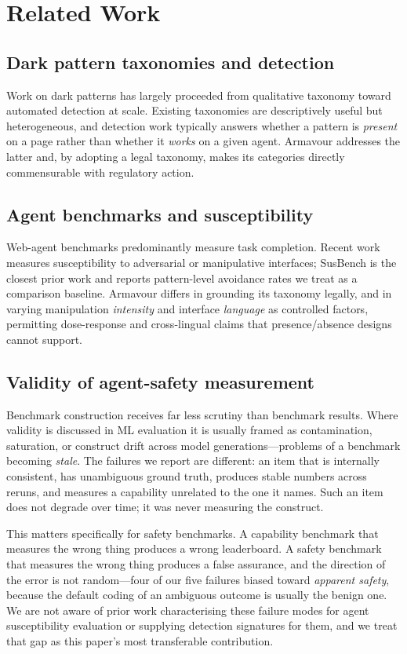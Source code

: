 \documentclass[conference]{IEEEtran}
\begin{document}
\section{Related Work}

\subsection{Dark pattern taxonomies and detection}

Work on dark patterns has largely proceeded from qualitative taxonomy
toward automated detection at scale. Existing taxonomies are
descriptively useful but heterogeneous, and detection work typically
answers whether a pattern is \emph{present} on a page rather than
whether it \emph{works} on a given agent. Armavour addresses the latter
and, by adopting a legal taxonomy, makes its categories directly
commensurable with regulatory action.

\subsection{Agent benchmarks and susceptibility}

Web-agent benchmarks predominantly measure task completion. Recent work
measures susceptibility to adversarial or manipulative interfaces;
SusBench is the closest prior work and reports pattern-level avoidance
rates we treat as a comparison baseline. Armavour differs in grounding
its taxonomy legally, and in varying manipulation \emph{intensity} and
interface \emph{language} as controlled factors, permitting
dose-response and cross-lingual claims that presence/absence designs
cannot support.

\subsection{Validity of agent-safety measurement}

Benchmark construction receives far less scrutiny than benchmark
results. Where validity is discussed in ML evaluation it is usually
framed as contamination, saturation, or construct drift across model
generations---problems of a benchmark becoming \emph{stale}. The
failures we report are different: an item that is internally consistent,
has unambiguous ground truth, produces stable numbers across reruns, and
measures a capability unrelated to the one it names. Such an item does
not degrade over time; it was never measuring the construct.

This matters specifically for safety benchmarks. A capability benchmark
that measures the wrong thing produces a wrong leaderboard. A safety
benchmark that measures the wrong thing produces a false assurance, and
the direction of the error is not random---four of our five failures
biased toward \emph{apparent safety}, because the default coding of an
ambiguous outcome is usually the benign one. We are not aware of prior
work characterising these failure modes for agent susceptibility
evaluation or supplying detection signatures for them, and we treat that
gap as this paper's most transferable contribution.
\end{document}
